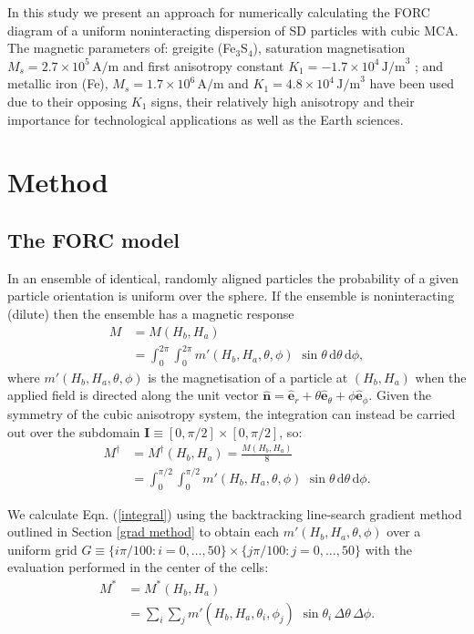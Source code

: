 In this study we present an approach for numerically calculating the FORC diagram of a uniform noninteracting dispersion of SD particles with cubic MCA. The magnetic parameters of: greigite (Fe$_3$S$_4$), saturation magnetisation $M_s=2.7\times 10^5 \, \text{A/m}$ \citep{Guowei2014} and first anisotropy constant $K_1=-1.7\times 10^4 \, \text{J/m}^3$ \citep{Winklhofer2014}; and metallic iron (Fe), $M_s=1.7\times 10^6 \, \text{A/m}$ \citep{Dunlop} and $K_1=4.8\times 10^4 \, \text{J/m}^3$ \citep{Graham1958} have been used due to their opposing $K_1$ signs, their relatively high anisotropy and their importance for technological applications as well as the Earth sciences.\par

\section{Method}
\subsection{The FORC model}
In an ensemble of identical, randomly aligned particles the probability of a given particle orientation is uniform over the sphere. If the ensemble is noninteracting (dilute) then the ensemble has a magnetic response
\begin{align}
M &= M(H_b, H_a) \nonumber \\
  &= {\int^{2\pi}_{0}}{\int^{2\pi}_{0}} m'(H_b, H_a, \theta, \phi)\,\,\sin\theta\,\text{d}\theta\,\text{d}\phi,
\end{align}
where $m'(H_b, H_a, \theta, \phi)$ is the magnetisation of a particle at $(H_b, H_a)$ when the applied field is directed along the unit vector $\boldsymbol{\hat{n}} = \boldsymbol{\hat{e}}_r + \theta\boldsymbol{\hat{e}}_\theta + \phi\boldsymbol{\hat{e}}_\phi$. Given the symmetry of the cubic anisotropy system, the integration can instead be carried out over the subdomain $\mathbf{I} \equiv [0, \pi/2] \times [0, \pi/2]$, so:
\begin{align}\label{integral}
M^{\dagger} &= M^{\dagger}(H_b, H_a) = \frac{M(H_b, H_a)}{8} \nonumber \\
            &= {\int^{\pi/2}_{0}}{\int^{\pi/2}_{0}} m'(H_b, H_a, \theta, \phi)\,\,\sin\theta\,\text{d}\theta\,\text{d}\phi.
\end{align}
\par

We calculate Eqn. (\ref{integral}) using the backtracking line-search gradient method outlined in Section \ref{grad method} to obtain each $m'(H_b, H_a, \theta, \phi)$ over a uniform grid $G \equiv \{i\pi/100: i=0,\ldots,50 \} \times \{j\pi/100: j=0,\ldots,50 \}$ with the evaluation performed in the center of the cells:
\begin{align}
M^{*} &= M^{*}(H_b, H_a) \nonumber \\
      &= {\sum_{i}}{\sum_{j}} m'(H_b, H_a, \theta_i, \phi_j)\,\,\sin\theta_i\,\Delta\theta\,\Delta\phi.
\end{align}
\par


